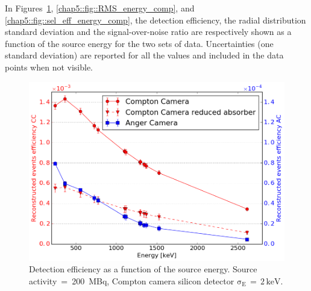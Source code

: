 In Figures~\ref{chap5::fig::eff_energy_comp}, \ref{chap5::fig::RMS_energy_comp}, and \ref{chap5::fig::sel_eff_energy_comp}, the detection efficiency, the radial distribution standard deviation and the signal-over-noise ratio are respectively shown as a function of the source energy for the two sets of data. Uncertainties (one standard deviation) are reported for all the values and included in the data points when not visible.


\begin{figure}[h!]
\begin{center}
\hspace{0.4cm} \includegraphics[scale=0.4]{03_GraphicFiles/chapter5_SPECTsimu/SPECT/comparison/reduced_absorber/effVSenergy_overlap}
\caption{Detection efficiency as a function of the source energy. Source activity~=~200~MBq, Compton camera silicon detector $\mathrm{\sigma_{E}\,=\,2\,keV}$.}
\label{chap5::fig::eff_energy_comp}
\end{center}
\end{figure}

